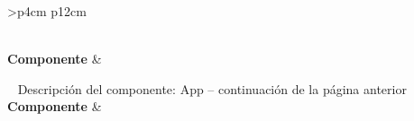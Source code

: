 \begin{longtable}{
    >{}p{4cm}
    p{12cm}
    }
    \caption{Descripción del componente:  App} \label{table:descripcion_app} \\
    \toprule
    \textbf{Componente} &  \\
    \endfirsthead
    
    {{ \tablename\ \thetable{} Descripción del componente:  App -- continuación de la página anterior}} \\
    \toprule
    \textbf{Componente} &  \\
    \midrule
    \endhead
    
    \midrule
     \\ 
    \endfoot
    
    \bottomrule
    \endlastfoot
    

\end{longtable}
